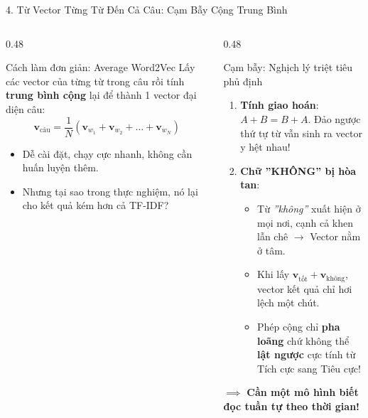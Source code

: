 \documentclass[aspectratio=169, 10pt]{beamer}
\begin{document}
\begin{frame}{4. Từ Vector Từng Từ Đến Cả Câu: Cạm Bẫy Cộng Trung Bình}
  \begin{columns}[T, onlytextwidth]
    \begin{column}{0.48\textwidth}
      \begin{block}{Cách làm đơn giản: Average Word2Vec}
        \fontsize{7.5}{9.5}\selectfont
        Lấy các vector của từng từ trong câu rồi tính \textbf{trung bình cộng} lại để thành 1 vector đại diện câu:
        $$\mathbf{v}_{\text{câu}} = \frac{1}{N} (\mathbf{v}_{w_1} + \mathbf{v}_{w_2} + \dots + \mathbf{v}_{w_N})$$
        \begin{itemize}\setlength{\itemsep}{0.15em}
          \item Dễ cài đặt, chạy cực nhanh, không cần huấn luyện thêm.
          \item Nhưng tại sao trong thực nghiệm, nó lại cho kết quả kém hơn cả TF-IDF?
        \end{itemize}
      \end{block}
    \end{column}
    \hfill
    \begin{column}{0.48\textwidth}
      \begin{alertblock}{Cạm bẫy: Nghịch lý triệt tiêu phủ định}
        \fontsize{7.5}{9.5}\selectfont
        \begin{enumerate}\setlength{\itemsep}{0.15em}
          \item \textbf{Tính giao hoán}: $A + B = B + A$. Đảo ngược thứ tự từ vẫn sinh ra vector y hệt nhau!
          \item \textbf{Chữ ''KHÔNG'' bị hòa tan}:
            \begin{itemize}\fontsize{7}{8.5}\selectfont
              \item Từ \textit{''không''} xuất hiện ở mọi nơi, cạnh cả khen lẫn chê $\to$ Vector nằm ở tâm.
              \item Khi lấy $\mathbf{v}_{\text{tốt}} + \mathbf{v}_{\text{không}}$, vector kết quả chỉ hơi lệch một chút.
              \item Phép cộng chỉ \textbf{pha loãng} chứ không thể \textbf{lật ngược} cực tính từ Tích cực sang Tiêu cực!
            \end{itemize}
        \end{enumerate}
        $\implies$ \textbf{Cần một mô hình biết đọc tuần tự theo thời gian!}
      \end{alertblock}
    \end{column}
  \end{columns}
\end{frame}
\end{document}

